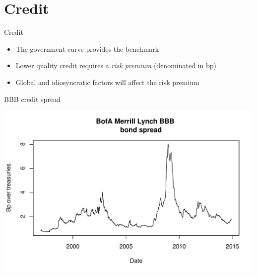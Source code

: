 \documentclass[14pt,xcolor=pdftex,dvipsnames,table]{beamer}\usepackage[]{graphicx}\usepackage[]{color}
\makeatletter
\def\maxwidth{ %
  \ifdim\Gin@nat@width>\linewidth
    \linewidth
  \else
    \Gin@nat@width
  \fi
}
\newenvironment{knitrout}{}{} %
\makeatother
\begin{document}
\section{Credit}
\begin{frame}{Credit}
\begin{itemize}[<+-| alert@+>]
\item The government curve provides the benchmark
\item Lower quality credit requires a \emph{risk premium} (denominated in bp)
\item Global and idiosyncratic factors will affect the risk premium
\end{itemize}
\end{frame}

\begin{frame}{BBB credit spread}
\begin{knitrout}
\color{fgcolor}

{\centering \includegraphics[width=\maxwidth]{figure/yield4-1} 

}



\end{knitrout}
\end{frame}
\end{document}
